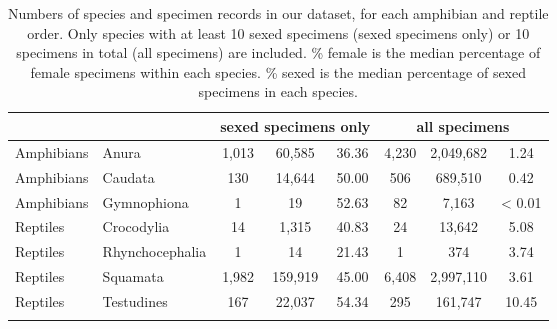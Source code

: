 \begin{longtable}{llcccccc}
\caption{Numbers of species and specimen records in our dataset, for each amphibian and reptile order. Only species with at least 10 sexed specimens (sexed specimens only) or 10 specimens in total (all specimens) are included. \% female is the median percentage of female specimens within each species. \% sexed is the median percentage of sexed specimens in each species.} \\ 
  \hline
  & & \multicolumn{3}{c}{\textbf{sexed specimens only}} & \multicolumn{3}{c}{\textbf{all specimens}} \\
  \hline
Amphibians &
Anura &
1,013 &
60,585  &
36.36 &
4,230 &
2,049,682 &
1.24\\
Amphibians &
Caudata &
130 &
14,644  &
50.00 &
506 &
689,510 &
0.42 \\
Amphibians &
Gymnophiona &
1 &
19 &
52.63 &
82 &
7,163 &
< 0.01\\

\hline

Reptiles &
Crocodylia &
14 &
1,315 &
40.83 &
24 &
13,642 &
5.08\\
Reptiles &
Rhynchocephalia &
1 &
14 &
21.43  &
1 &
374 &
3.74 \\
Reptiles &
Squamata  &
1,982 &
159,919  &
45.00 &
6,408 &
2,997,110 &
3.61 \\
Reptiles &
Testudines  &
167 &
22,037 &
54.34 &
295 &
161,747 &
10.45\\
\hline
\label{table-percents}
\end{longtable}